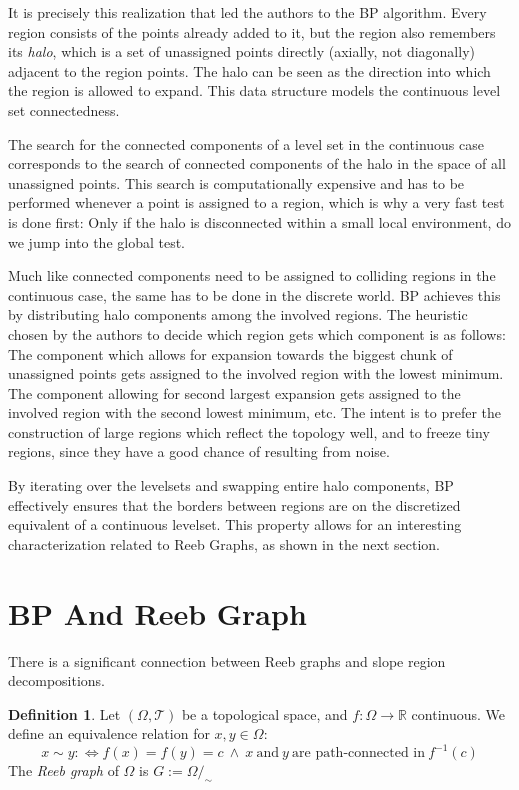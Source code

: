 \documentclass[a4paper,12pt,notitlepage,fullpage]{paper}
\theoremstyle{plain}
\theoremstyle{definition}
\newtheorem{defn}[thm]{Definition} %
\begin{document}
It is precisely this realization that led the authors to the BP algorithm. Every region consists of the points already added to it, but the region also remembers its \emph{halo}, which is a set of unassigned points directly (axially, not diagonally) adjacent to the region points. The halo can be seen as the direction into which the region is allowed to expand. This data structure models the continuous level set connectedness.

The search for the connected components of a level set in the continuous case corresponds to the search of connected components of the halo in the space of all unassigned points. This search is computationally expensive and has to be performed whenever a point is assigned to a region, which is why a very fast test is done first: Only if the halo is disconnected within a small local environment, do we jump into the global test.

Much like connected components need to be assigned to colliding regions in the continuous case, the same has to be done in the discrete world. BP achieves this by distributing halo components among the involved regions. The heuristic chosen by the authors to decide which region gets which component is as follows: The component which allows for expansion towards the biggest chunk of unassigned points gets assigned to the involved region with the lowest minimum. The component allowing for second largest expansion gets assigned to the involved region with the second lowest minimum, etc. The intent is to prefer the construction of large regions which reflect the topology well, and to freeze tiny regions, since they have a good chance of resulting from noise.


By iterating over the levelsets and swapping entire halo components, BP effectively ensures that the borders between regions are on the discretized equivalent of a continuous levelset. This property allows for an interesting characterization related to Reeb Graphs, as shown in the next section.

\section{BP And Reeb Graph}
\label{sec:reeb}

There is a significant connection between Reeb graphs and slope region decompositions.

\begin{defn}
Let $(\Omega, \mathcal T)$ be a topological space, and $f: \Omega \to \mathbb R$ continuous. We define an equivalence relation for $x,y \in \Omega$: 
\begin{equation*}
x \sim y :\Leftrightarrow f(x) = f(y) = c ~\land ~ x ~\text{and}~ y ~\text{are path-connected in}~ f^{-1}(c)
\end{equation*}
The \emph{Reeb graph} of $\Omega$ is $G := \Omega/_\sim$
\end{defn}
\end{document}
